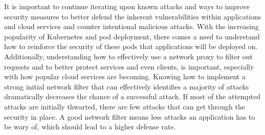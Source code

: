 

It is important to continue iterating upon known attacks and ways to improve security measures to better defend the inherent vulnerabilities within applications and cloud services and
counter intentional malicious attacks. With the increasing popularity of Kubernetes and pod deployment, there comes a need to understand how to reinforce the security of these pods that
applications will be deployed on. Additionally, understanding how to effectively use a network proxy to filter out requests and to better protect services and even clients, is important,
especially with how popular cloud services are becoming. Knowing how to implement a strong initial network filter that can effectively identifies a majority of attacks dramatically decreases 
the chance of a successful attack. If most of the attempted attacks are initially thwarted, there are few attacks that can get through the security in place. A good network filter means less
attacks an application has to be wary of, which should lead to a higher defense rate.
